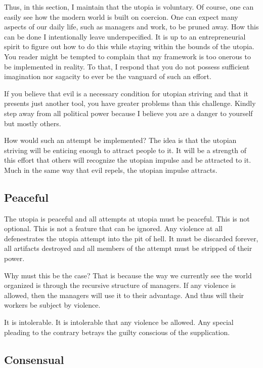 \documentclass[12pt]{article}
\begin{document}
Thus, in this section, I maintain that the utopia is voluntary.
Of course, one can easily see how the modern world is built on coercion.
One can expect many aspects of our daily life, such as managers and work, to be pruned away.
How this can be done I intentionally leave underspecified.
It is up to an entrepreneurial spirit to figure out how to do this while staying within the bounds of the utopia.
You reader might be tempted to complain that my framework is too onerous to be implemented in reality.
To that, I respond that you do not possess sufficient imagination nor sagacity to ever be the vanguard of such an effort.

If you believe that evil is a necessary condition for utopian striving and that it presents just another tool, you have greater problems than this challenge.
Kindly step away from all political power because I believe you are a danger to yourself but mostly others.

How would such an attempt be implemented?
The idea is that the utopian striving will be enticing enough to attract people to it.
It will be a strength of this effort that others will recognize the utopian impulse and be attracted to it.
Much in the same way that evil repels, the utopian impulse attracts.

\subsection{Peaceful}
The utopia is peaceful and all attempts at utopia must be peaceful.
This is not optional.
This is not a feature that can be ignored.
Any violence at all defenestrates the utopia attempt into the pit of hell.
It must be discarded forever, all artifacts destroyed and all members of the attempt must be stripped of their power.

Why must this be the case?
That is because the way we currently see the world organized is through the recursive structure of managers.
If any violence is allowed, then the managers will use it to their advantage.
And thus will their workers be subject by violence.

It is intolerable.
It is intolerable that any violence be allowed.
Any special pleading to the contrary betrays the guilty conscious of the supplication.


\subsection{Consensual}
\end{document}
